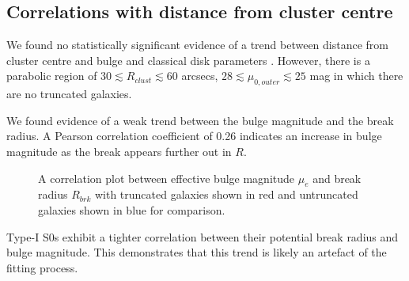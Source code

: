 
\subsection{Correlations with distance from cluster centre} %
\label{sub:correlations}
We found no statistically significant evidence of a trend between distance from cluster centre and bulge and classical disk parameters . However, there is a parabolic region of $30 \lesssim R_{clust} \lesssim 60$ arcsecs, $28 \lesssim \mu_{0,outer} \lesssim 25$ mag in which there are no truncated galaxies.

We found evidence of a weak trend between the bulge magnitude and the break radius. A Pearson correlation coefficient of 0.26 indicates an increase in bulge magnitude as the break appears further out in $R$.
\begin{figure}[h]
	\centering
	\label{bulge/break correlation}
	\caption{\footnotesize{A correlation plot between effective bulge magnitude $\mu_e$ and break radius $R_{brk}$ with truncated galaxies shown in red and untruncated galaxies shown in blue for comparison.}}
\end{figure}
Type-I S0s exhibit a tighter correlation between their potential break radius and bulge magnitude. This demonstrates that this trend is likely an artefact of the fitting process.

